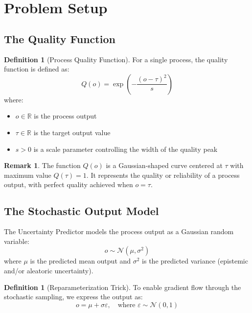 \documentclass[11pt,a4paper]{article}
\theoremstyle{definition}
\newtheorem{definition}[theorem]{Definition}
\newtheorem{remark}[theorem]{Remark}
\newcommand{\R}{\mathbb{R}}
\newcommand{\N}{\mathcal{N}}
\begin{document}
\section{Problem Setup}

\subsection{The Quality Function}

\begin{definition}[Process Quality Function]
For a single process, the quality function is defined as:
\begin{equation}
    Q(o) = \exp\left(-\frac{(o - \tau)^2}{s}\right)
\end{equation}
where:
\begin{itemize}
    \item $o \in \R$ is the process output
    \item $\tau \in \R$ is the target output value
    \item $s > 0$ is a scale parameter controlling the width of the quality peak
\end{itemize}
\end{definition}

\begin{remark}
The function $Q(o)$ is a Gaussian-shaped curve centered at $\tau$ with maximum value $Q(\tau) = 1$. It represents the quality or reliability of a process output, with perfect quality achieved when $o = \tau$.
\end{remark}

\subsection{The Stochastic Output Model}

The Uncertainty Predictor models the process output as a Gaussian random variable:
\begin{equation}
    o \sim \N(\mu, \sigma^2)
\end{equation}
where $\mu$ is the predicted mean output and $\sigma^2$ is the predicted variance (epistemic and/or aleatoric uncertainty).

\begin{definition}[Reparameterization Trick]
To enable gradient flow through the stochastic sampling, we express the output as:
\begin{equation}
    o = \mu + \sigma\varepsilon, \quad \text{where } \varepsilon \sim \N(0, 1)
\end{equation}
\end{definition}
\end{document}
